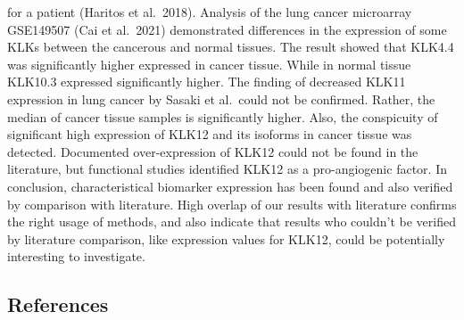 \documentclass[
]{article}
\begin{document}
for a patient (Haritos et al.~2018). Analysis of the lung cancer
microarray GSE149507 (Cai et al.~2021) demonstrated differences in the
expression of some KLKs between the cancerous and normal tissues. The
result showed that KLK4.4 was significantly higher expressed in cancer
tissue. While in normal tissue KLK10.3 expressed significantly higher.
The finding of decreased KLK11 expression in lung cancer by Sasaki et
al.~could not be confirmed. Rather, the median of cancer tissue samples
is significantly higher. Also, the conspicuity of significant high
expression of KLK12 and its isoforms in cancer tissue was detected.
Documented over-expression of KLK12 could not be found in the
literature, but functional studies identified KLK12 as a pro-angiogenic
factor. In conclusion, characteristical biomarker expression has been
found and also verified by comparison with literature. High overlap of
our results with literature confirms the right usage of methods, and
also indicate that results who couldn't be verified by literature
comparison, like expression values for KLK12, could be potentially
interesting to investigate.

\newpage

\hypertarget{references}{%
\subsection{References}\label{references}}
\end{document}
